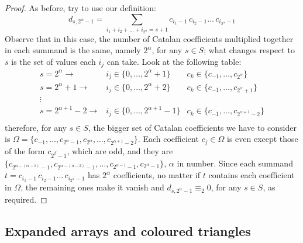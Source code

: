\documentclass[11pt,a4paper]{article} %
\begin{document}
    \begin{proof}
    As before, try to use our definition:
    \begin{displaymath}
        d_{s, 2^{\alpha}-1} = \sum_{i_{1}+i_{2}+\ldots+i_{2^{\alpha}}=s+1}
            {c_{i_{1}-1}\,c_{i_{2}-1}\ldots\,c_{i_{2^{\alpha}}-1}}
    \end{displaymath}
    Observe that in this case, the number of Catalan coefficients
    multiplied together in each summand is the same, namely $2^{\alpha}$,
    for any $s\in S$; what changes respect to $s$ is the set of values 
    each $i_{j}$ can take. Look at the following table:
    \begin{displaymath}
        \begin{array}{rcc}
            s = 2^{\alpha} \rightarrow
                & i_{j}\in\lbrace0,\ldots,2^{\alpha}+1\rbrace 
                & c_{k}\in\lbrace c_{-1},\ldots,c_{2^{\alpha}}\rbrace\\
            s = 2^{\alpha} +1\rightarrow
                & i_{j}\in\lbrace0,\ldots,2^{\alpha}+2\rbrace 
                & c_{k}\in\lbrace c_{-1},\ldots,c_{2^{\alpha}+1}\rbrace\\
            \vdots & & \\
            s = 2^{\alpha+1} -2\rightarrow
                & i_{j}\in\lbrace0,\ldots,2^{\alpha+1}-1\rbrace 
                & c_{k}\in\lbrace c_{-1},\ldots,c_{2^{\alpha+1}-2}\rbrace\\
        \end{array}
    \end{displaymath}
    therefore, for any $s\in S$, the bigger set of Catalan coefficients we have 
    to consider is $\Omega = \lbrace c_{-1},\ldots,c_{2^{\alpha}-1},c_{2^{\alpha}},\ldots,c_{2^{\alpha+1}-2}\rbrace$.
    Each coefficient $c_{j}\in\Omega$ is even except those of the form $c_{2^{\beta}-1}$, which are odd,
    and they are $\lbrace c_{2^{\alpha-(\alpha-1)}-1},c_{2^{\alpha-(\alpha-2)}-1},\ldots, 
        c_{2^{\alpha-1}-1},c_{2^{\alpha}-1}\rbrace$, $\alpha$ in number.
    Since each summand $t=c_{i_{1}-1}\,c_{i_{2}-1}\ldots\,c_{i_{2^{\alpha}}-1}$ 
    has $2^{\alpha}$ coefficients, no matter if $t$ contains each coefficient in $\Omega$,
    the remaining ones make it vanish and $ d_{s, 2^{\alpha}-1} \equiv_{2} 0$, for any $s\in S$,
    as required.


    \end{proof}



    \subsection{Expanded arrays and coloured triangles}
\end{document}
